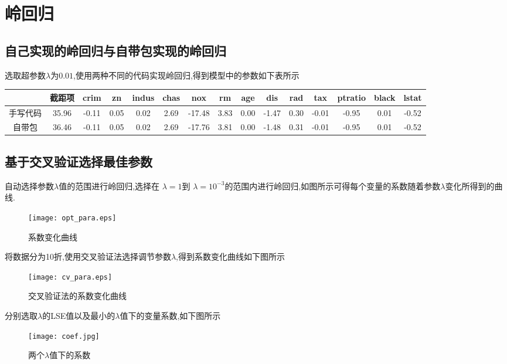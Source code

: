 \section{岭回归}
\subsection{自己实现的岭回归与自带包实现的岭回归}
选取超参数$\lambda$为$0.01$,使用两种不同的代码实现岭回归,得到模型中的参数如下表所示

\begin{table}[htbp]
\centering
\begin{tabular}{ccccccccccccccc}
  \hline
 & 截距项 & crim & zn & indus & chas & nox & rm & age & dis & rad & tax & ptratio & black & lstat \\ 
  \hline
  手写代码 & 35.96 & -0.11 & 0.05 & 0.02 & 2.69 & -17.48 & 3.83 & 0.00 & -1.47 & 0.30 & -0.01 & -0.95 & 0.01 & -0.52 \\ 
  自带包& 36.46 & -0.11 &  0.05 &  0.02  & 2.69 &-17.76 &3.81  & 0.00&  -1.48&   0.31 & -0.01&  -0.95&0.01&-0.52\\
   \hline
\end{tabular}
\end{table}

\subsection{基于交叉验证选择最佳参数}

自动选择参数$\lambda$值的范围进行岭回归,选择在 $\lambda =1$到 $\lambda = 10^{-3}$的范围内进行岭回归,如图所示可得每个变量的系数随着参数$\lambda$变化所得到的曲线.
\begin{figure}[htbp]
  \centering
  \caption{系数变化曲线}
  \texttt{[image: opt\_para.eps]}
\end{figure}

将数据分为10折,使用交叉验证法选择调节参数$\lambda$,得到系数变化曲线如下图所示
\begin{figure}[htbp]
  \centering
  \caption{交叉验证法的系数变化曲线}
  \texttt{[image: cv\_para.eps]}
\end{figure}

分别选取$\lambda$的LSE值以及最小的$\lambda$值下的变量系数,如下图所示
\begin{figure}[htbp]
  \centering
  \caption{两个$\lambda$值下的系数}
  \texttt{[image: coef.jpg]}
\end{figure}
